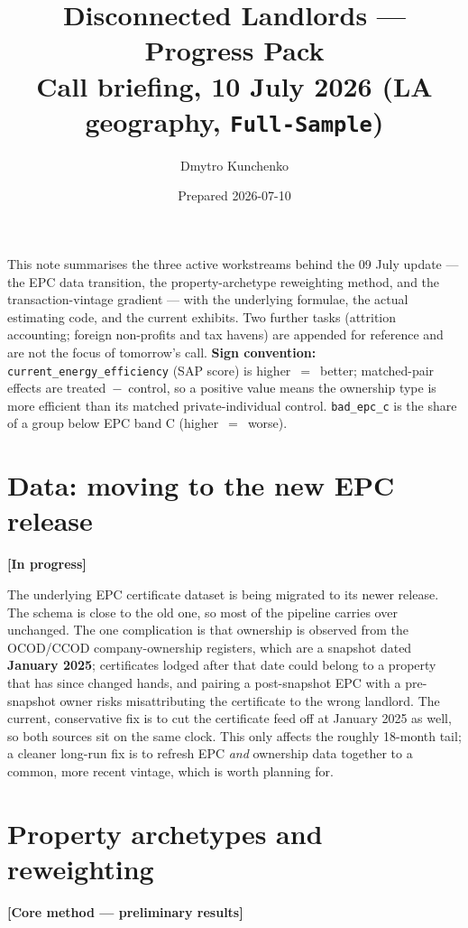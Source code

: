 \documentclass[11pt]{article}
\title{\vspace{-1.2cm}\color{dlnavy}\textbf{Disconnected Landlords --- Progress Pack}\\[2pt]
\large\normalcolor Call briefing, 10 July 2026 (LA geography, \texttt{Full-Sample})}
\author{Dmytro Kunchenko}
\date{Prepared 2026-07-10}
\newcommand{\status}[1]{\textcolor{dlnavy}{\textbf{[#1]}}}
\begin{document}
\maketitle
\vspace{-0.6cm}

\noindent This note summarises the three active workstreams behind the 09 July
update --- the EPC data transition, the property-archetype reweighting method, and
the transaction-vintage gradient --- with the underlying formulae, the actual
estimating code, and the current exhibits. Two further tasks (attrition accounting;
foreign non-profits and tax havens) are appended for reference and are not the focus
of tomorrow's call. \textbf{Sign convention:} \texttt{current\_energy\_efficiency}
(SAP score) is higher~$=$~better; matched-pair effects are treated~$-$~control, so a
positive value means the ownership type is more efficient than its matched
private-individual control. \texttt{bad\_epc\_c} is the share of a group below EPC
band C (higher~$=$~worse).

\vspace{-0.1cm}
{\small\tableofcontents}
\clearpage

\section{Data: moving to the new EPC release}
\status{In progress}

The underlying EPC certificate dataset is being migrated to its newer release. The
schema is close to the old one, so most of the pipeline carries over unchanged. The
one complication is that ownership is observed from the OCOD/CCOD company-ownership
registers, which are a snapshot dated \textbf{January 2025}; certificates lodged
after that date could belong to a property that has since changed hands, and pairing
a post-snapshot EPC with a pre-snapshot owner risks misattributing the certificate to
the wrong landlord. The current, conservative fix is to cut the certificate feed off
at January 2025 as well, so both sources sit on the same clock. This only affects the
roughly 18-month tail; a cleaner long-run fix is to refresh EPC \emph{and} ownership
data together to a common, more recent vintage, which is worth planning for.

\section{Property archetypes and reweighting}
\status{Core method --- preliminary results}
\end{document}
